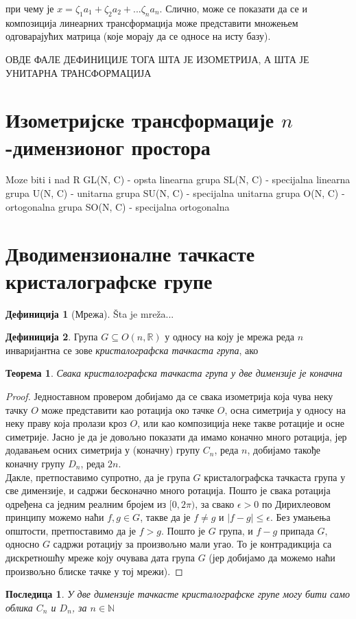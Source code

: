 \documentclass{report}
\theoremstyle{plain}
\newtheorem{thm}{Теорема}
\newtheorem*{cor}{Последица}
\theoremstyle{definition}
\newtheorem{defn}{Дефиниција}
\begin{document}
при чему је $x = \zeta_1 a_1 + \zeta_2 a_2 + ... \zeta_n a_n$. Слично, може се показати да се и композиција линеарних трансформација може представити множењем одговарајућих матрица (које морају да се односе на исту базу).

ОВДЕ ФАЛЕ ДЕФИНИЦИЈЕ ТОГА ШТА ЈЕ ИЗОМЕТРИЈА, А ШТА ЈЕ УНИТАРНА ТРАНСФОРМАЦИЈА


\section{Изометријске трансформације $n$-димензионог простора}
Moze biti i nad R
GL(N, C) - opsta linearna grupa
SL(N, C) - specijalna linearna grupa
U(N, C) - unitarna grupa
SU(N, C) - specijalna unitarna grupa
O(N, C) - ortogonalna grupa
SO(N, C) - specijalna ortogonalna
\section{Дводимензионалне тачкасте кристалографске групе}
\begin{defn}[Мрежа]
\v Sta je mre\v za...
\end{defn}
\begin{defn}
Група $G\subseteq O(n, \mathbb{R})$ у односу на коју је мрежа реда $n$ инваријантна се зове \emph{кристалографска тачкаста група}, ако
\end{defn}

\begin{thm}
Свака кристалографска тачкаста група у две димензије је коначна
\end{thm}
\begin{proof}
Једноставном провером добијамо да се свака изометрија која чува неку тачку $O$ може представити као ротација око тачке $O$, осна симетрија у односу на неку праву која пролази кроз $O$, или као композиција неке такве ротације и осне симетрије. Јасно је да је довољно показати да имамо коначно много ротација, јер додавањем осних симетрија у (коначну) групу $C_n$, реда $n$, добијамо такође коначну групу $D_n$, реда $2n$.\\
Дакле, претпоставимо супротно, да је група $G$ кристалографска тачкаста група у све димензије, и садржи бесконачно много ротација. Пошто је свака ротација одређена са једним реалним бројем из $[0,2\pi)$, за свако $\epsilon>0$ по Дирихлеовом принципу можемо наћи $f, g\in G$, такве да је $f\neq g$ и $|f-g|\leq\epsilon$. Без умањења општости, претпоставимо да је $f>g$. Пошто је $G$ група, и $f-g$ припада $G$, односно $G$ садржи ротацију за произвољно мали угао. То је контрадикција са дискретношћу мреже коју очувава дата група $G$ (јер добијамо да можемо наћи произвољно блиске тачке у тој мрежи).
\end{proof}
\begin{cor}
У две димензије тачкасте кристалографске групе могу бити само облика $C_n$ и $D_n$, за $n\in\mathbb{N}$
\end{cor}
\end{document}
